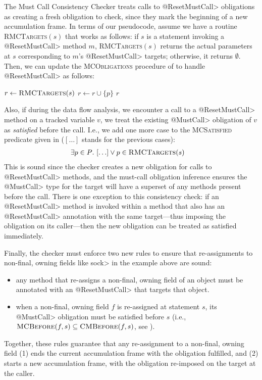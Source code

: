 The Must Call Consistency Checker treats calls to \<@ResetMustCall> obligations
as creating a fresh obligation to check, since they mark the beginning of a new
accumulation frame.  In terms of our pseudocode, assume we have a routine
\textsc{RMCTargets}$(s)$ that works as follows: if $s$ is a
statement invoking a \<@ResetMustCall> method $m$, \textsc{RMCTargets}$(s)$ returns
the actual parameters at $s$ corresponding to $m$'s \<@ResetMustCall> targets;
otherwise, it returns $\emptyset$.  Then, we can update the
\textsc{MCObligations} procedure of  to handle
\<@ResetMustCall> as follows:
\begin{algorithmic}
    \State $r \gets \textsc{RMCTargets}(s)$
      \State $r \gets r \cup \{p\}$
    \EndIf
    \State \Return $r$
    \EndProcedure
\end{algorithmic}
Also, if during the data flow analysis, we encounter a call to a \<@ResetMustCall>
method on a tracked variable $v$, we treat the existing \<@MustCall>
obligation of $v$ as \emph{satisfied} before the call.  I.e., we add one more
case to the \textsc{MCSatisfied} predicate given in
 ($[\ldots]$ stands for the previous cases):
\begin{align*}
  \exists p \in P &.\ [\ldots] \vee p \in \textsc{RMCTargets}(s)
\end{align*}
This is sound since the checker creates a new obligation for calls to
\<@ResetMustCall> methods, and the must-call obligation inference ensures the
\<@MustCall> type for the target will have a superset of any methods present
before the call.
There is one exception to this consistency check: if an \<@ResetMustCall>
method is invoked within a method that also has an \<@ResetMustCall> annotation
with the same target---thus imposing the obligation on its caller---then
the new obligation can be treated as satisfied immediately.

Finally, the checker must enforce two new rules to ensure that
re-assignments to non-final, owning fields like \<sock> in the example
above are sound:
\begin{itemize}
\item any method that re-assigns a non-final, owning field of an object
  must be annotated with an \<@ResetMustCall> that targets that object.
\item when a non-final, owning field $f$ is re-assigned at statement $s$, its \<@MustCall> obligation
must be satisfied before $s$ (i.e., $\textsc{MCBefore}(f,s) \subseteq
\textsc{CMBefore}(f,s)$, see ).
\end{itemize}
\noindent
Together, these rules guarantee that any re-assignment to a non-final, owning
field (1) ends the current accumulation frame with the obligation fulfilled,
and (2) starts a new accumulation frame, with the obligation re-imposed on
the target at the caller.

